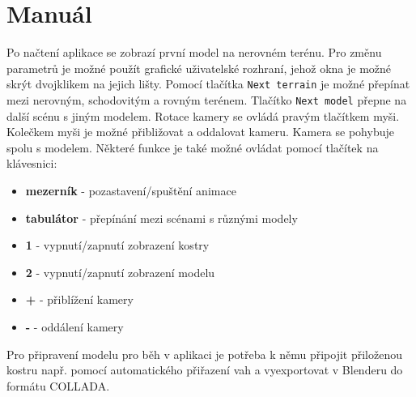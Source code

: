 \chapter{Manuál}
Po načtení aplikace se zobrazí první model na nerovném terénu. Pro změnu parametrů je možné použít grafické uživatelské rozhraní, jehož okna je možné skrýt dvojklikem na jejich lišty. Pomocí tlačítka \texttt{Next terrain} je možné přepínat mezi nerovným, schodovitým a rovným terénem. Tlačítko \texttt{Next model} přepne na další scénu s  jiným modelem.
Rotace kamery se ovládá pravým tlačítkem myši. Kolečkem myši je možné přibližovat a oddalovat kameru. Kamera se pohybuje spolu s modelem.
Některé funkce je také možné ovládat pomocí tlačítek na klávesnici: 
\begin{itemize} \itemsep1pt \parskip0pt 
\item[] \textbf{mezerník} - pozastavení/spuštění animace
\item[] \textbf{tabulátor} - přepínání mezi scénami s různými modely
\item[] \textbf{1} - vypnutí/zapnutí zobrazení kostry
\item[] \textbf{2} - vypnutí/zapnutí zobrazení modelu
\item[] \textbf{+} - přiblížení kamery
\item[] \textbf{-} - oddálení kamery
\end{itemize}

Pro připravení modelu pro běh v aplikaci je potřeba k němu připojit přiloženou kostru např. pomocí automatického přiřazení vah a vyexportovat v Blenderu do formátu COLLADA.


